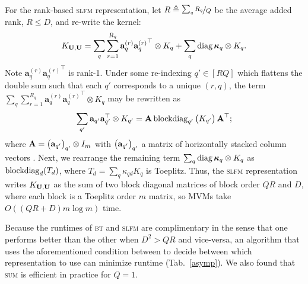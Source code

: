 \documentclass{article}
\begin{document}
For the rank-based \textsc{slfm} representation, let $R\triangleq \nicefrac{\sum_qR_q}{Q}$ be the average added rank, $R\le D$, and re-write the kernel:
\begin{align*}
  K_{\textbf{U},\textbf{U}}=\sum_q\sum_{r=1}^{R_q}\textbf{a}_q^{(r)}{\textbf{a}_q^{(r)}}^\top\otimes K_q + \sum_q\operatorname{diag}{\boldsymbol\kappa}_q \otimes K_q.
\end{align*}
Note $\textbf{a}_q^{(r)}{\textbf{a}_q^{(r)}}^\top$ is rank-1. Under some re-indexing $q'\in[RQ]$ which flattens the double sum such that each $q'$ corresponds to a unique $(r, q)$, the term $\sum_q\sum_{r=1}^{R_q}\textbf{a}_q^{(r)}{\textbf{a}_q^{(r)}}^\top\otimes K_q $ may be rewritten as
\begin{align*}
  \sum_{q'}\textbf{a}_{q'}\textbf{a}_{q'}^\top\otimes K_{q'} = \textbf{A}\operatorname{blockdiag}_{q'}\begin{pmatrix} K_{q'} \end{pmatrix}\textbf{A}^\top;
\end{align*}
where $\textbf{A}=\begin{pmatrix}  \textbf{a}_{q'} \end{pmatrix}_{q'}\otimes I_m$ with $\begin{pmatrix}  \textbf{a}_{q'} \end{pmatrix}_{q'}$ a matrix of horizontally stacked column vectors \cite{seeger2005semiparametric}. Next, we rearrange the remaining term $\sum_q\operatorname{diag}{\boldsymbol\kappa}_q \otimes K_q$ as $\operatorname{blockdiag}_d(T_d)$, where $T_d=\sum_q \kappa_{qd}K_q$ is Toeplitz. Thus, the \textsc{slfm} representation writes $K_{\textbf{U},\textbf{U}}$ as the sum of two block diagonal matrices of block order $QR$ and $D$, where each block is a Toeplitz order $m$ matrix, so MVMs take $O((QR + D)m\log m)$ time.

Because the runtimes of \textsc{bt} and \textsc{slfm} are complimentary in the sense that one performs better than the other when $D^2>QR$ and vice-versa, an algorithm that uses the aforementioned condition between to decide between which representation to use can minimize runtime (Tab.~\ref{asymp}). We also found that \textsc{sum} is efficient in practice for $Q=1$.
\end{document}
